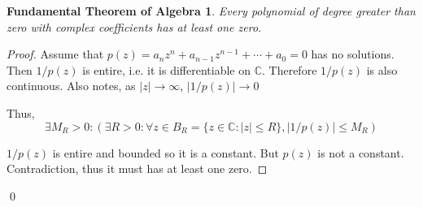 \documentclass{article}
\newtheorem*{thm}{Fundamental Theorem of Algebra}
\theoremstyle{definition}\newtheorem{definition}{Definition}
\begin{document}
\begin{thm}
	
	Every polynomial of degree greater than zero with complex coefficients has at least one zero.
\end{thm}	

\begin{proof}
	Assume that $p(z)=a_nz^n+a_{n-1}z^{n-1}+\cdots+a_0=0$ has no solutions. Then $1/p(z)$ is entire, i.e. it is differentiable on $\mathbb{C}$. Therefore $1/p(z)$ is also continuous. Also notes, as $|z| \rightarrow \infty$, $|1/p(z)| \rightarrow 0$
	
	Thus, $$\exists M_R>0 :(  \exists R>0:\forall z \in B_R=\{z\in \mathbb{C}: |z|\leq R\}, |1/p(z)| \leq M_R)$$
	

	$1/p(z)$ is entire and bounded so it is a constant. But $p(z)$ is not a constant. Contradiction, thus it must has at least one zero.
\end{proof}
\qed
			
\end{document}
